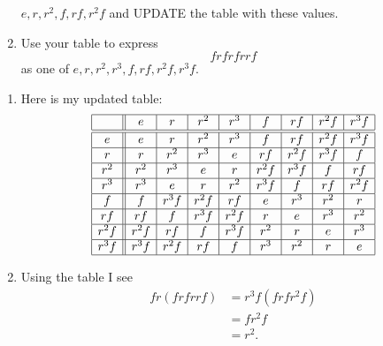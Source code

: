 \documentclass[noauthor,nooutcomes,12pt,hints,handout]{ximera}
\begin{document}
\begin{question}
\begin{enumerate}
      $e,r,r^2,f,rf,r^2f$ and UPDATE the table with these values.
    \item Use your table to express
      \[
      frfrfrrf
      \]
      as one of $e,r,r^2,r^3,f,rf,r^2f, r^3f$.
  \end{enumerate}
  \begin{freeResponse}
    \begin{enumerate}
      \item Here is my updated table:
  \[
  \begin{array}{|c||c|c|c|c|c|c|c|c|}
    \hline
         & e    & r     & r^2     & r^3      & f      & rf     & r^2f      &  r^3 f\\ \hline\hline
    e    & e    & r     & r^2     & r^3      & f      & rf     & r^2f      &  r^3 f\\ \hline
    r    & r    & r^2   & r^3     & e        & rf     & r^2f   & r^3f      & f\\ \hline
    r^2  & r^2  & r^3   & e       & r        & r^2f   & r^3f   &    f      & r  f\\ \hline
    r^3  & r^3  & e     & r       & r^2      & r^3f   &    f   & r  f      & r^2f\\ \hline
    f    & f    & r^3f  & r^2f    & rf       & e      & r^3    & r^2       & r    \\ \hline
    rf   & rf   &  f    & r^3f    & r^2f     & r      & e      & r^3       & r^2   \\ \hline
    r^2f & r^2f & r f   & f       & r^3f     & r^2    & r      & e         & r^3     \\ \hline
    r^3f & r^3f & r^2f  & rf      & f        & r^3    & r^2    & r         & e       \\ \hline
  \end{array}
  \]
\item Using the table I see
  \begin{align*}
    fr(frfrrf) &= r^3f(frfr^2f)\\
    &=fr^2f\\
    &=r^2.
  \end{align*}
    \end{enumerate}
  \end{freeResponse}
\end{question}
\end{document}
